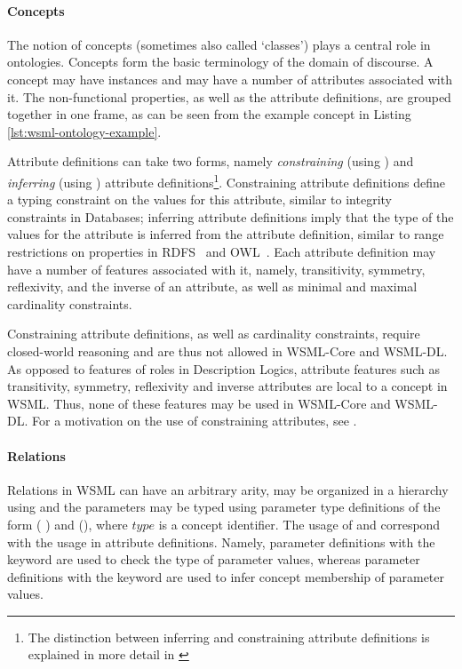 \paragraph{Concepts}
The notion of concepts (sometimes also called `classes') plays a
central role in ontologies. Concepts form the basic terminology of
the domain of discourse. A concept may have instances and may have a
number of attributes associated with it. The non-functional
properties, as well as the attribute definitions, are grouped
together in one frame, as can be seen from the example concept
 in Listing \ref{lst:wsml-ontology-example}.

Attribute definitions can take two forms, namely \emph{constraining}
(using ) and \emph{inferring} (using
) attribute definitions\footnote{The distinction
  between inferring and constraining attribute definitions is
  explained in more detail in \cite[Section
  2]{Bruijn+PolleresETAL-:05}}. Constraining attribute definitions
define a typing constraint on the values for this attribute, similar
to integrity constraints in Databases; inferring attribute
definitions imply that the type of the values for the attribute is
inferred from the attribute definition, similar to range
restrictions on properties in
RDFS~\cite{Brickley+Guha-VocaDescLang:03} and
OWL~\cite{Dean+Schreiber-OntoLangRefe:04}.  Each attribute
definition may have a number of features associated with it, namely,
transitivity, symmetry, reflexivity, and the inverse of an
attribute, as well as minimal and maximal cardinality constraints.

Constraining attribute definitions, as well as cardinality
constraints, require closed-world reasoning and are thus not allowed
in WSML-Core and WSML-DL. As opposed to features of roles in
Description Logics, attribute features such as transitivity,
symmetry, reflexivity and inverse attributes are local to a concept
in WSML. Thus, none of these features may be used in WSML-Core and
WSML-DL. For a motivation on the use of constraining attributes, see
\cite{Bruijn+PolleresETAL-:05}.

\paragraph{Relations}
Relations in WSML can have an arbitrary arity, may be organized in a
hierarchy using  and the parameters may be
typed using parameter type definitions of the form
( ) and (), where $type$ is a
concept identifier. The usage of  and
 correspond with the usage in attribute
definitions. Namely, parameter definitions with the 
keyword are used to check the type of parameter values, whereas
parameter definitions with the  keyword are used
to infer concept membership of parameter values.

